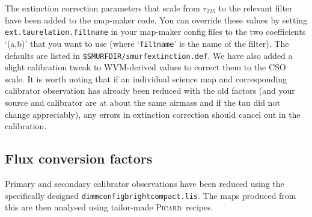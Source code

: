 \documentclass[twoside,11pt]{article}
\newcommand{\xref}[3]{#1}
\newcommand{\xlabel}[1]{}
\renewcommand{\_}{\texttt{\symbol{95}}}
\newcommand{\picard}{\xref{\textsc{Picard}}{sun231}{}}
\newcommand{\param}[1]{\texttt{#1}}
\begin{document}
The extinction correction parameters that scale from $\tau_{225}$ to the relevant filter have been added to the map-maker code. You can override these values by setting \param{ext.taurelation.filtname} in your map-maker config files to the two coefficients `(a,b)' that you want to use (where `\texttt{filtname}' is the name of the filter). The defaults are listed in \texttt{\$SMURF\_DIR/smurf\_extinction.def}. We have also added a slight calibration tweak to WVM-derived values to correct them to the CSO scale. It is worth noting that if an individual science map and corresponding calibrator observation has already been reduced with the old factors (and your source and calibrator are at about the same airmass and if the tau did not change appreciably), any errors in extinction correction should cancel out in the calibration.


\subsection{\xlabel{fcf}Flux conversion factors}
\label{sec:fcf}

Primary and secondary calibrator observations have been reduced using
the specifically designed
\texttt{dimmconfig\_bright\_compact.lis}. The maps produced from this
are then analysed using tailor-made \picard\ recipes. 
\end{document}
